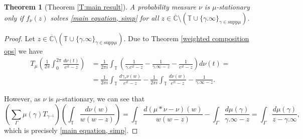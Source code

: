 \documentclass[11pt]{article}
\newtheorem{theorem}{Theorem}[section]
\begin{document}
\begin{theorem}[Theorem \ref{T:main result}]
	\label{T:Cauchy transform solves main eq}
	A probability measure $\nu$ is $\mu$-stationary only if $f_\nu(z)$ solves \eqref{main equation, simp} for all $z \in \overline{\mathbb{C}} \setminus (\mathbb{T} \cup \{\gamma.\infty\}_{\gamma \in \text{supp} \mu} )$.
\end{theorem}
\begin{proof}
	Let $z \in \overline{\mathbb{C}} \setminus (\mathbb{T} \cup \{\gamma.\infty\}_{\gamma \in \text{supp} \mu} )$. Due to Theorem \ref{weighted composition ops} we have
	\[
	\begin{aligned}
		T_\mu \left( \frac{1}{2 \pi} \int_{0}^{2 \pi} \frac{d\nu(t)}{e^{it} -  z} \right) &= \frac{1}{2 \pi i}  \int_{\mathbb{T}} \left(  \frac{1}{\gamma.e^{it} -  z} - \frac{1}{\gamma.\infty - z} - \frac{1}{e^{it} -  z} \right)  d \nu(t) = \\ 
		&= \frac{1}{2 \pi i}  \int_{\mathbb{T}} \frac{d \gamma_* \nu(w)}{e^{it} -  z}  -  \frac{1}{2 \pi i}\int_{\mathbb{T}} \frac{d \nu(w)}{e^{it} -  z}  - \frac{1}{\gamma.\infty - z} .
	\end{aligned}
	\]
	
	However, as $\nu$ is $\mu$-stationary, we can see that
	\[
	\left( \sum_\Gamma \mu(\gamma) T_{\gamma^{-1}} \right) \left(  \int_{\mathbb{T}} \frac{d \nu(w)}{w(w - z)} \right)  = \int_{\mathbb{T}} \frac{d (\mu * \nu - \nu) (w)}{w(w - z)}  - \int_\Gamma \frac{d \mu(\gamma)}{\gamma.\infty - z} = \int_\Gamma \frac{d \mu(\gamma)}{z - \gamma.\infty},
	\]
	which is precisely \eqref{main equation, simp}.
\end{proof}
\end{document}
